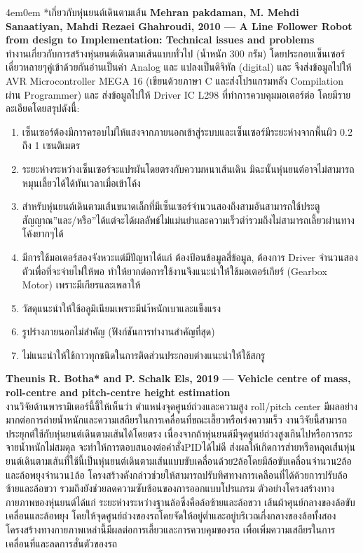 \documentclass[14pt, fleqn, a4paper]{extarticle}
\makeatletter
\renewcommand\subsubsection{%
  \@ifstar{\flatsubsubsection}{\@subsubsection}%
}
\newcommand{\flatsubsubsection}[1]{%
   \par\medskip\noindent
   {\bfseries #1\par}
}
\makeatother
\begin{document}
\begin{adjustwidth}{4em}{0em}
	\subsubsection*{เกี่ยวกับหุ่นยนต์เดินตามเส้น} \vspace{-0.75em}
	\textbf{Mehran pakdaman, M. Mehdi Sanaatiyan, Mahdi Rezaei Ghahroudi, 2010 — A Line Follower Robot from design to Implementation: Technical issues and problems} \\
	\indent ทำงานเกี่ยวกับการสร้างหุ่นยนต์เดินตามเส้นแบบทั่วไป (น้ำหนัก 300 กรัม) โดยประกอบเซ็นเซอร์เดี่ยวหลายๆคู่เข้าด้วยกันอ่านเป็นค่า Analog และ แปลงเป็นดิจิทัล (digital) และ จึงส่งข้อมูลไปให้ AVR Microcontroller MEGA 16 (เขียนด้วยภาษา C และส่งโปรแกรมหลัง Compilation ผ่าน Programmer) และ ส่งข้อมูลไปให้ Driver IC L298 ที่ทำการควบคุมมอเตอร์ต่อ โดยมีรายละเอียดโดยสรุปดังนี้: 
	\vspace{-0.5em}
	\begin{enumerate}
		\item เซ็นเซอร์ต้องมีการครอบไม่ให้แสงจากภายนอกเข้าสู่ระบบและเซ็นเซอร์มีระยะห่างจากพื้นผิว 0.2 ถึง 1 เซนติเมตร 
		\item ระยะห่างระหว่างเซ็นเซอร์จะแปรผันโดยตรงกับความหนาเส้นเดิน มิฉะนั้นหุ่นยนต์อาจไม่สามารถหมุนเลี้ยวได้ได้ทันเวลาเมื่อเข้าโค้ง 
		\item สำหรับหุ่นยนต์เดินตามเส้นขนาดเล็กที่มีเซ็นเซอร์จำนวนสองถึงสามอันสามารถใช้ประตูสัญญาณ”และ/หรือ”ได้แต่จะได้ผลลัพธ์ไม่แม่นยำและความเร็วตำ่รวมถึงไม่สามารถเลี้ยวผ่านทางโค้งยากๆได้ 
		\item มีการใช้มอเตอร์สองจังหวะแต่มีปัญหาได้แก่ ต้องป้อนข้อมูลสี่ข้อมูล, ต้องการ Driver จำนวนสองตัวเพื่อที่จะจ่ายไฟให้พอ ทำให้ยากต่อการใช้งานจึงแนะนำให้ใช้มอเตอร์เกียร์ (Gearbox Motor) เพราะมีเกียรและเพลาให้
		\item วัสดุแนะนำให้ใช้อลูมิเนียมเพราะมีนำ้หนักเบาและแข็งแรง 
		\item รูปร่างภายนอกไม่สำคัญ (ฟังก์ชันการทำงานสำคัญที่สุด) 
		\item ไม่แนะนำให้ใช้กาวทุกชนิดในการติดส่วนประกอบต่างแนะนำให้ใช้สกรู
	\end{enumerate}
	\vspace{-0.5em}
	\textbf{Theunis R. Botha* and P. Schalk Els, 2019 — Vehicle centre of mass, roll-centre and pitch-centre height estimation} \\
	\indent
	งานวิจัยด้านพารามิเตอร์นี้ชี้ให้เห็นว่า ตำแหน่งจุดศูนย์ถ่วงและความสูง roll/pitch center มีผลอย่างมากต่อการถ่ายน้ำหนักและความเสถียรในการเคลื่อนที่ขณะเลี้ยวหรือเร่งความเร็ว งานวิจัยนี้สามารถประยุกต์ใช้กับหุ่นยนต์เดินตามเส้นได้โดยตรง เนื่องจากถ้าหุ่นยนต์มีจุดศูนย์ถ่วงสูงเกินไปหรือการกระจายน้ำหนักไม่สมดุล จะทำให้การตอบสนองต่อคำสั่งPIDได้ไม่ดี ส่งผลให้เกิดการส่ายหรือหลุุดเส้่นหุ่นยนต์เดินตามเส้นที่ใช้นี้เป็นหุ่นยนต์เดินตามเส้นแบบขับเคลื่อนด้วย2ล้อโดยมีล้อขับเคลื่อนจำนวน2ล้อและล้อพยุงจำนวน1ล้อ โครงสร้างดังกล่าวช่วยให้สามารถปรับทิศทางการเคลือนที่ได้ด้วยการปรับล้อซ้ายและล้อขวา รวมถึงยังช่วยลดความซับซ้อนของการออกแบบโปรแกรม ตัวอย่างโครงสร้างทางกายภาพของหุ่นยนต์ได้แก่ ระยะห่างระหว่างฐานล้อซึ่งคือล้อซ้ายและล้อขวา เส้นผ้าศุนย์กลางของล้อขับเคลื่อนและล้อพยุง  โดยให้จุดศูนย์ถ่วงของรถโดยจัดให้อยู่ต่ำและอยู่บริเวณกึ่งกลางของล้อทั้งสอง โครงสร้างทางกายภาพเหล่านี้มีผลต่อการเลี้ยวและการควบคุมของรถ เพื่อเพิ่มความเสถียรในการเคลื่อนที่และลดการสั่นตัวของรถ \\

\end{adjustwidth}
\end{document}

